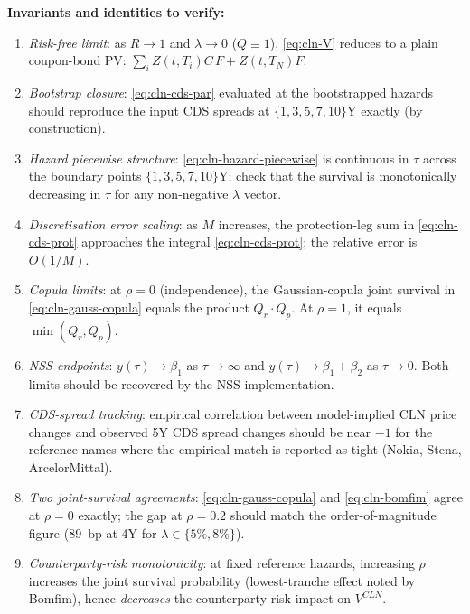 \documentclass[11pt,a4paper]{article}
\begin{document}
\begin{validation}
\textbf{Invariants and identities to verify:}
\begin{enumerate}[noitemsep]
  \item \emph{Risk-free limit}: as $R \to 1$ and $\lambda \to 0$
        ($Q \equiv 1$), \eqref{eq:cln-V} reduces to a plain
        coupon-bond PV: $\sum_i Z(t, T_i) C\, F + Z(t, T_N) F$.
  \item \emph{Bootstrap closure}: \eqref{eq:cln-cds-par} evaluated
        at the bootstrapped hazards should reproduce the input CDS
        spreads at $\{1, 3, 5, 7, 10\}$Y exactly (by construction).
  \item \emph{Hazard piecewise structure}: \eqref{eq:cln-hazard-piecewise}
        is continuous in $\tau$ across the boundary points
        $\{1, 3, 5, 7, 10\}$Y; check that the survival is monotonically
        decreasing in $\tau$ for any non-negative $\lambda$ vector.
  \item \emph{Discretisation error scaling}: as $M$ increases, the
        protection-leg sum in \eqref{eq:cln-cds-prot} approaches the
        integral \eqref{eq:cln-cds-prot}; the relative error is
        $O(1/M)$.
  \item \emph{Copula limits}: at $\rho = 0$ (independence), the
        Gaussian-copula joint survival in \eqref{eq:cln-gauss-copula}
        equals the product $Q_r \cdot Q_p$. At $\rho = 1$, it equals
        $\min(Q_r, Q_p)$.
  \item \emph{NSS endpoints}: $y(\tau) \to \beta_1$ as $\tau \to \infty$
        and $y(\tau) \to \beta_1 + \beta_2$ as $\tau \to 0$. Both
        limits should be recovered by the NSS implementation.
  \item \emph{CDS-spread tracking}: empirical correlation between
        model-implied CLN price changes and observed 5Y CDS spread
        changes should be near $-1$ for the reference names where
        the empirical match is reported as tight (Nokia, Stena,
        ArcelorMittal).
  \item \emph{Two joint-survival agreements}: \eqref{eq:cln-gauss-copula}
        and \eqref{eq:cln-bomfim} agree at $\rho = 0$ exactly; the
        gap at $\rho = 0.2$ should match the order-of-magnitude
        figure (89~bp at 4Y for $\lambda \in \{5\%, 8\%\}$).
  \item \emph{Counterparty-risk monotonicity}: at fixed reference
        hazards, increasing $\rho$ increases the joint survival
        probability (lowest-tranche effect noted by Bomfim), hence
        \emph{decreases} the counterparty-risk impact on $V^{CLN}$.
\end{enumerate}
\end{validation}
\end{document}
